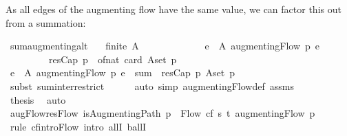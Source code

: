 \begin{isabellebody}
\endisatagproof
{\isafoldproof}%
%
\isadelimproof
%
\endisadelimproof
%
\begin{isamarkuptext}%
As all edges of the augmenting flow have the same value, we can factor 
  this out from a summation:%
\end{isamarkuptext}\isamarkuptrue%
\isamarkupfalse%
\ sum{\isacharunderscore}augmenting{\isacharunderscore}alt{\isacharcolon}\isanewline
\ \ \ {\isachardoublequoteopen}finite\ A{\isachardoublequoteclose}\ \ \ \ \ \ \ \ \ \ \isanewline
\ \ \ {\isachardoublequoteopen}{\isacharparenleft}{\isasymSum}e\ {\isasymin}\ A{\isachardot}\ {\isacharparenleft}augmentingFlow\ p{\isacharparenright}\ e{\isacharparenright}\ \isanewline
\ \ \ \ \ \ \ \ {\isacharequal}\ resCap\ p\ {\isacharasterisk}\ of{\isacharunderscore}nat\ {\isacharparenleft}card\ {\isacharparenleft}A{\isasyminter}set\ p{\isacharparenright}{\isacharparenright}{\isachardoublequoteclose}\isanewline
%
\isadelimproof
%
\endisadelimproof
%
\isatagproof
{}\isamarkupfalse%
\ {\isacharminus}\isanewline
\ \ \isamarkupfalse%
\ {\isachardoublequoteopen}{\isacharparenleft}{\isasymSum}e\ {\isasymin}\ A{\isachardot}\ {\isacharparenleft}augmentingFlow\ p{\isacharparenright}\ e{\isacharparenright}\ {\isacharequal}\ sum\ {\isacharparenleft}{\isasymlambda}{\isacharunderscore}{\isachardot}\ resCap\ p{\isacharparenright}\ {\isacharparenleft}A{\isasyminter}set\ p{\isacharparenright}{\isachardoublequoteclose}\isanewline
\ \ \ \ \isamarkupfalse%
\ {\isacharparenleft}subst\ sum{\isachardot}inter{\isacharunderscore}restrict{\isacharparenright}\isanewline
\ \ \ \ \isamarkupfalse%
\ {\isacharparenleft}auto\ simp{\isacharcolon}\ augmentingFlow{\isacharunderscore}def\ assms{\isacharparenright}\isanewline
\ \ \ \ \isamarkupfalse%
\isanewline
\ \ \isamarkupfalse%
\ {\isacharquery}thesis\ \isamarkupfalse%
\ auto\isanewline
{}\isamarkupfalse%
%
\endisatagproof
{\isafoldproof}%
%
\isadelimproof
\ \ \isanewline
%
\endisadelimproof
\isanewline
{}\isamarkupfalse%
\ augFlow{\isacharunderscore}resFlow{\isacharcolon}\ {\isachardoublequoteopen}isAugmentingPath\ p\ {\isasymLongrightarrow}\ Flow\ cf\ s\ t\ {\isacharparenleft}augmentingFlow\ p{\isacharparenright}{\isachardoublequoteclose}\isanewline
%
\isadelimproof
%
\endisadelimproof
%
\isatagproof
{}\isamarkupfalse%
\ {\isacharparenleft}rule\ cf{\isachardot}intro{\isacharunderscore}Flow{\isacharsemicolon}\ intro\ allI\ ballI{\isacharparenright}\isanewline

\end{isabellebody}
